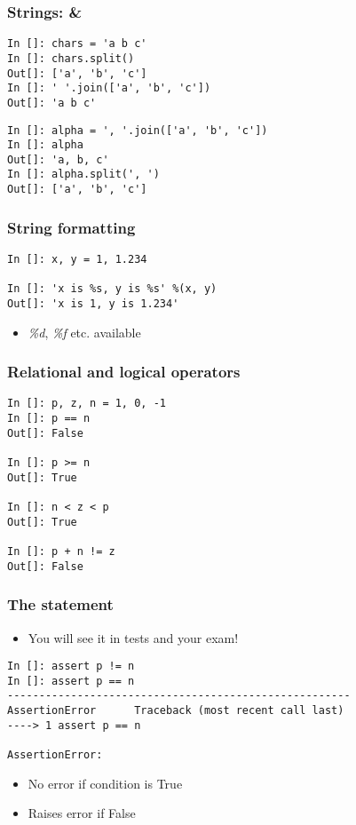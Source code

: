 \documentclass[14pt,compress]{beamer}
\begin{document}
\begin{frame}[fragile]
\frametitle{Strings:  \& }
  \begin{lstlisting}
In []: chars = 'a b c'
In []: chars.split()
Out[]: ['a', 'b', 'c']
In []: ' '.join(['a', 'b', 'c'])
Out[]: 'a b c'
  \end{lstlisting}
  \begin{lstlisting}
In []: alpha = ', '.join(['a', 'b', 'c'])
In []: alpha
Out[]: 'a, b, c'
In []: alpha.split(', ')
Out[]: ['a', 'b', 'c']
  \end{lstlisting}
\end{frame}

\begin{frame}[fragile]
\frametitle{String formatting}
  \begin{lstlisting}
In []: x, y = 1, 1.234

In []: 'x is %s, y is %s' %(x, y)
Out[]: 'x is 1, y is 1.234'
  \end{lstlisting}
  \begin{itemize}
    \item \emph{\%d}, \emph{\%f} etc. available
  \end{itemize}
\end{frame}

\begin{frame}[fragile]
  \frametitle{Relational and logical operators}
  \begin{lstlisting}
In []: p, z, n = 1, 0, -1
In []: p == n
Out[]: False

In []: p >= n
Out[]: True

In []: n < z < p
Out[]: True

In []: p + n != z
Out[]: False
  \end{lstlisting}
\end{frame}

\begin{frame}[fragile]
  \frametitle{The  statement}
  \begin{itemize}
  \item You will see it in tests and your exam!
  \end{itemize}

  \begin{small}
\begin{lstlisting}
In []: assert p != n
In []: assert p == n
------------------------------------------------------
AssertionError      Traceback (most recent call last)
----> 1 assert p == n

AssertionError:
\end{lstlisting}
  \end{small}
  \begin{itemize}
  \item No error if condition is True
  \item Raises error if False
  \end{itemize}
\end{frame}
\end{document}
